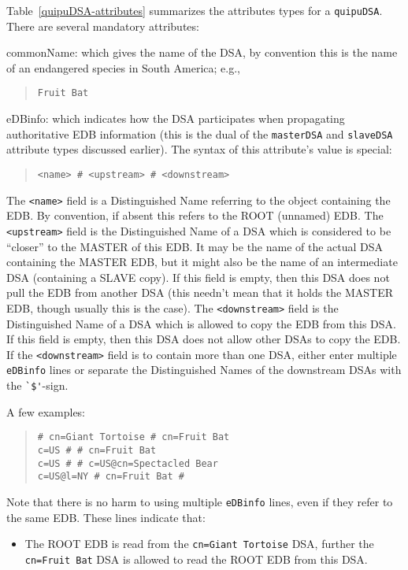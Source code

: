 Table~\ref{quipuDSA-attributes} summarizes the attributes types for
a \verb"quipuDSA".
There are several mandatory attributes:
\begin{describe}
\item[commonName:]
			which gives the name of the DSA,
			by convention this is the name of an endangered species
			in South America; e.g.,
\begin{quote}\small\begin{verbatim}
Fruit Bat
\end{verbatim}\end{quote}

\item[eDBinfo:]
			which indicates how the DSA participates when
			propagating authoritative EDB information
			(this is the dual
			of the \verb"masterDSA" and \verb"slaveDSA"
			attribute types discussed earlier).
			The syntax of this attribute's value is special:
\begin{quote}\small\begin{verbatim}
<name> # <upstream> # <downstream>
\end{verbatim}\end{quote}
The \verb"<name>" field is a Distinguished Name referring to the object
containing the EDB.
By convention, if absent this refers to the ROOT (unnamed) EDB.
The \verb"<upstream>" field is the Distinguished Name of a DSA which is
considered to be ``closer'' to the MASTER of this EDB.
It may be the name of the actual DSA containing the MASTER EDB,
but it might also be the name of an intermediate DSA (containing a SLAVE copy).
If this field is empty,
then this DSA does not pull the EDB from another DSA
(this needn't mean that it holds the MASTER EDB,
though usually this is the case).
The \verb"<downstream>" field is the Distinguished Name of a DSA which is
allowed to copy the EDB from this DSA.
If this field is empty,
then this DSA does not allow other DSAs to copy the EDB.
If the \verb"<downstream>" field is to contain more than one DSA,
either enter multiple \verb"eDBinfo" lines or separate the Distinguished
Names of the downstream DSAs with the \verb"`$'"-sign.

A few examples:
\begin{quote}\small\begin{verbatim}
# cn=Giant Tortoise # cn=Fruit Bat
c=US # # cn=Fruit Bat
c=US # # c=US@cn=Spectacled Bear
c=US@l=NY # cn=Fruit Bat #
\end{verbatim}\end{quote}
Note that there is no harm to using multiple \verb"eDBinfo" lines,
even if they refer to the same EDB.
These lines indicate that:
\begin{itemize}
\item	The ROOT EDB is read from the \verb"cn=Giant Tortoise" DSA,
	further the \verb"cn=Fruit Bat" DSA is allowed to read the
	ROOT EDB from this DSA.


\end{itemize}
\end{describe}
